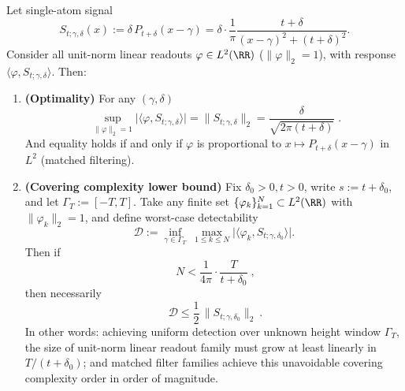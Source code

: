 \begin{theorem}\label{thm:xi-offcritical-poisson-matched-filter-covering}
Let single-atom signal
\[
S_{t;\gamma,\delta}(x):=\delta\,P_{t+\delta}(x-\gamma)
=\delta\cdot\frac{1}{\pi}\frac{t+\delta}{(x-\gamma)^2+(t+\delta)^2}.
\]
Consider all unit-norm linear readouts \(\varphi\in L^2(\RR)\) (\(\|\varphi\|_2=1\)), with response \(\langle \varphi,S_{t;\gamma,\delta}\rangle\).
Then:
\begin{enumerate}
  \item \textbf{(Optimality)} For any \((\gamma,\delta)\)
  \begin{equation}\label{eq:xi-offcritical-poisson-matched-filter-opt}
  \boxed{\;
  \sup_{\|\varphi\|_2=1}\bigl|\langle \varphi,S_{t;\gamma,\delta}\rangle\bigr|
  =\|S_{t;\gamma,\delta}\|_2
  =\frac{\delta}{\sqrt{2\pi(t+\delta)}}\; }.
  \end{equation}
  And equality holds if and only if \(\varphi\) is proportional to \(x\mapsto P_{t+\delta}(x-\gamma)\) in \(L^2\) (matched filtering).
  \item \textbf{(Covering complexity lower bound)} Fix \(\delta_0>0,t>0\), write \(s:=t+\delta_0\), and let \(\Gamma_T:=[-T,T]\).
  Take any finite set \(\{\varphi_k\}_{k=1}^{N}\subset L^2(\RR)\) with \(\|\varphi_k\|_2=1\), and define worst-case detectability
  \[
  \mathcal D
  :=\inf_{\gamma\in\Gamma_T}\ \max_{1\le k\le N}
  \bigl|\langle \varphi_k,S_{t;\gamma,\delta_0}\rangle\bigr|.
  \]
  Then if
  \begin{equation}\label{eq:xi-offcritical-poisson-covering-lb}
  \boxed{\;
  N<\frac{1}{4\pi}\cdot\frac{T}{t+\delta_0}\; },
  \end{equation}
  then necessarily
  \[
  \boxed{\ \mathcal D\le \frac12\,\|S_{t;\gamma,\delta_0}\|_2\ }.
  \]
  In other words: achieving uniform detection over unknown height window \(\Gamma_T\), the size of unit-norm linear readout family must grow at least linearly in \(T/(t+\delta_0)\); and matched filter families achieve this unavoidable covering complexity order in order of magnitude.
\end{enumerate}
\end{theorem}

